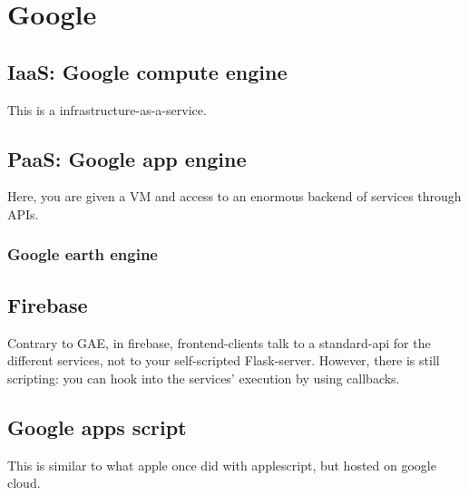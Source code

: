 \section{Google}

\subsection{IaaS: Google compute engine}
This is a infrastructure-as-a-service.

\subsection{PaaS: Google app engine}
Here, you are given a VM and access to an enormous backend of services through APIs.

\subsubsection{Google earth engine}

\subsubsection{}

\subsection{Firebase}
Contrary to GAE, in firebase, frontend-clients talk to a standard-api for the different services, not to your self-scripted Flask-server. However, there is still scripting: you can hook into the services' execution by using callbacks. 

\subsection{Google apps script}
This is similar to what apple once did with applescript, but hosted on google cloud.
